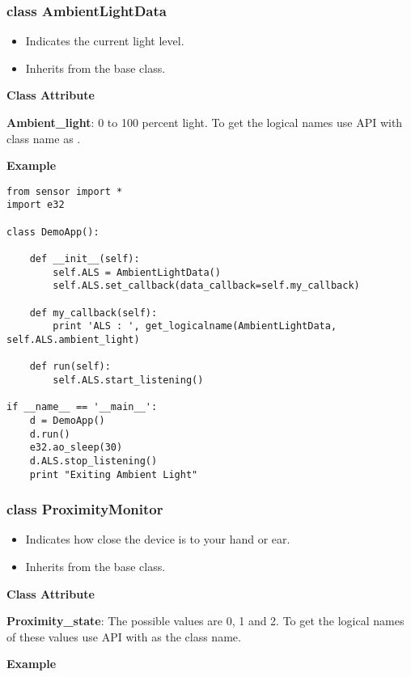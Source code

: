 \subsubsection{class AmbientLightData}

\begin{itemize}
\item Indicates the current light level.
\item Inherits from the  base class.
\end{itemize}

{\bf Class Attribute} \break

{\bf Ambient_light}: 0 to 100 percent light. To get the logical names use  API with class name as .

{\bf Example} \break

\begin{verbatim}
from sensor import *
import e32

class DemoApp():

    def __init__(self):
        self.ALS = AmbientLightData()
        self.ALS.set_callback(data_callback=self.my_callback)

    def my_callback(self):
        print 'ALS : ', get_logicalname(AmbientLightData, self.ALS.ambient_light)

    def run(self):
        self.ALS.start_listening()

if __name__ == '__main__':
    d = DemoApp()
    d.run()
    e32.ao_sleep(30)
    d.ALS.stop_listening()
    print "Exiting Ambient Light"
\end{verbatim}

\subsubsection{class ProximityMonitor}

\begin{itemize}
\item Indicates how close the device is to your hand or ear.
\item Inherits from the  base class.
\end{itemize}

{\bf Class Attribute} \break

{\bf Proximity_state}: The possible values are 0, 1 and 2. To get the logical names of these values use  API with  as the class name.

{\bf Example} \break

